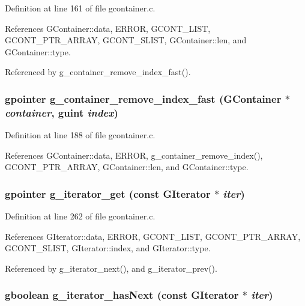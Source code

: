Definition at line 161 of file gcontainer.c.

References GContainer::data, ERROR, GCONT\_\-LIST, GCONT\_\-PTR\_\-ARRAY, GCONT\_\-SLIST, GContainer::len, and GContainer::type.

Referenced by g\_\-container\_\-remove\_\-index\_\-fast().
\subsubsection{\setlength{\rightskip}{0pt plus 5cm}gpointer g\_\-container\_\-remove\_\-index\_\-fast ({\bf GContainer} $\ast$ {\em container}, guint {\em index})}\label{gcontainer_8h_a11}




Definition at line 188 of file gcontainer.c.

References GContainer::data, ERROR, g\_\-container\_\-remove\_\-index(), GCONT\_\-PTR\_\-ARRAY, GContainer::len, and GContainer::type.
\subsubsection{\setlength{\rightskip}{0pt plus 5cm}gpointer g\_\-iterator\_\-get (const {\bf GIterator} $\ast$ {\em iter})}\label{gcontainer_8h_a15}




Definition at line 262 of file gcontainer.c.

References GIterator::data, ERROR, GCONT\_\-LIST, GCONT\_\-PTR\_\-ARRAY, GCONT\_\-SLIST, GIterator::index, and GIterator::type.

Referenced by g\_\-iterator\_\-next(), and g\_\-iterator\_\-prev().
\subsubsection{\setlength{\rightskip}{0pt plus 5cm}gboolean g\_\-iterator\_\-has\-Next (const {\bf GIterator} $\ast$ {\em iter})}\label{gcontainer_8h_a18}




